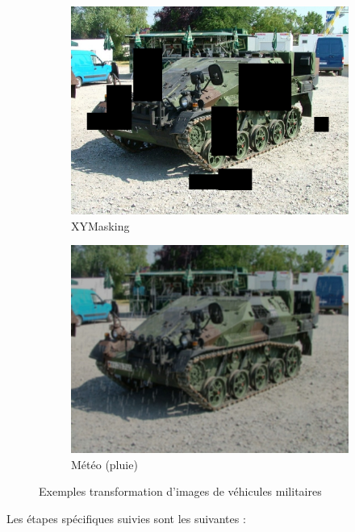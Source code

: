 \begin{figure}[H]
\begin{subfigure}[b]{0.40\textwidth}
		\includegraphics[width=\textwidth]{./images/xymasking.jpg}
		\caption{XYMasking}
		\label{fig:xymasking}
	\end{subfigure}
	\hfill
	\begin{subfigure}[b]{0.40\textwidth}
		\centering
		\includegraphics[width=\textwidth]{./images/weather_effect.jpg}
		\caption{Météo (pluie)}
		\label{fig:meteo}
	\end{subfigure}
	\caption{Exemples transformation d'images de véhicules militaires}
	\label{fig:military-vehicles}
\end{figure}



\noindent Les étapes spécifiques suivies sont les suivantes :


